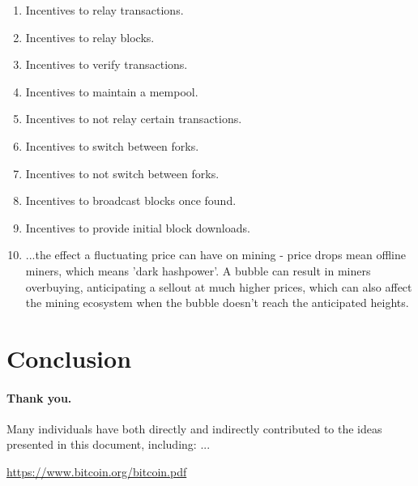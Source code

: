 \documentclass[letterpaper]{article}
\begin{document}
\begin{enumerate}
\item Incentives to relay transactions.

\item Incentives to relay blocks.

\item Incentives to verify transactions.

\item Incentives to maintain a mempool.

\item Incentives to not relay certain transactions.

\item Incentives to switch between forks.

\item Incentives to not switch between forks.

\item Incentives to broadcast blocks once found.

\item Incentives to provide initial block downloads.

\item ...the effect a fluctuating price can have on mining - price drops mean offline miners, which means 'dark hashpower'. A bubble can result in miners overbuying, anticipating a sellout at much higher prices, which can also affect the mining ecosystem when the bubble doesn't reach the anticipated heights.

\end{enumerate}

\section{Conclusion}

\paragraph{Thank you.} Many individuals have both directly and indirectly
contributed to the ideas presented in this document, including: ...

\begin{thebibliography}{9}
 \url{https://www.bitcoin.org/bitcoin.pdf}
\end{thebibliography}
\end{document}
